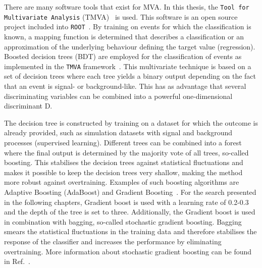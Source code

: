 There are many software tools that exist for MVA. In this thesis,  the \texttt{Tool for Multivariate Analysis} (TMVA)~\cite{2007physics3039H} is used. This software is an open source project included into \texttt{ROOT}~\cite{Brun:1997pa}. 
 By training on events for which the classification is known, a mapping function is determined that describes a classification or an approximation of the underlying behaviour defining the target value (regression). Boosted decision trees (BDT) are employed for the classification of events as implemented in the \texttt{TMVA} framework~\cite{2007physics3039H}. This multivariate technique is based on a set of decision trees where each tree yields a binary output depending on the fact that an event is signal- or background-like. This has as advantage  that several discriminating variables can be combined into a powerful one-dimensional discriminant D. 
 
\newpage
The decision tree is constructed by training on a dataset for which the outcome is already provided, such as simulation datasets with signal and background processes (supervised learning). Different trees can be combined into a forest where the final output is determined by the majority vote of all trees, so-called boosting. This stabilises the decision trees against statistical fluctuations and makes it possible to keep the decision trees very shallow, making the method more robust against overtraining. Examples of such boosting algorithms are Adaptive Boosting (AdaBoost) and Gradient Boosting~\cite{2014arXiv1403.1452M}.  For the search presented in the following chapters, Gradient boost is used with a learning rate of 0.2-0.3 and the depth of the tree is set to three. Additionally, the Gradient boost is used in combination with bagging, so-called stochastic gradient boosting. Bagging smears the statistical fluctuations in the training data and therefore  stabilises the response of the classifier and increases the performance by eliminating overtraining.  More information about stochastic gradient boosting can be found in Ref.~\cite{Behnke:2013:DAH:2564838}.%

